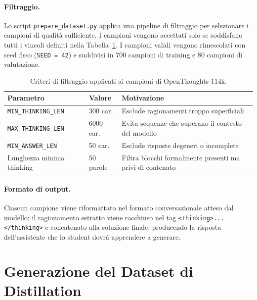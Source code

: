 \paragraph{Filtraggio.}
Lo script \texttt{prepare\_dataset.py} applica una pipeline di
filtraggio per selezionare i campioni di qualità sufficiente.
I campioni vengono accettati solo se soddisfano tutti i vincoli
definiti nella Tabella~\ref{tab:filtri}. I campioni validi vengono
rimescolati con seed fisso (\texttt{SEED = 42}) e suddivisi in
700 campioni di training e 80 campioni di valutazione.

\begin{table}[t]
  \centering
  \caption{Criteri di filtraggio applicati ai campioni di OpenThoughts-114k.}
  \label{tab:filtri}
  \small
  \renewcommand{\arraystretch}{1.3}
  \begin{tabular}{l l p{6cm}}
    \toprule
    \textbf{Parametro} & \textbf{Valore} & \textbf{Motivazione} \\
    \midrule
    \texttt{MIN\_THINKING\_LEN} & 300 car. &
      Esclude ragionamenti troppo superficiali \\
    \texttt{MAX\_THINKING\_LEN} & 6000 car. &
      Evita sequenze che superano il contesto del modello \\
    \texttt{MIN\_ANSWER\_LEN}   & 50 car. &
      Esclude risposte degeneri o incomplete \\
    Lunghezza minima thinking   & 50 parole &
      Filtra blocchi formalmente presenti ma privi di contenuto \\
    \bottomrule
  \end{tabular}
\end{table}

\paragraph{Formato di output.}
Ciascun campione viene riformattato nel formato conversazionale
atteso dal modello: il ragionamento estratto viene racchiuso nel
tag \texttt{<thinking>...</thinking>} e concatenato alla soluzione
finale, producendo la risposta dell'assistente che lo student dovrà
apprendere a generare.

\FloatBarrier
\section{Generazione del Dataset di Distillation}
\label{sec:step1b}

